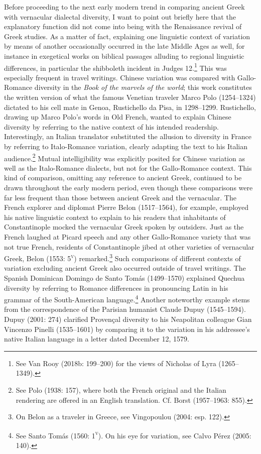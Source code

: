 \begin{styleStandard}
Before proceeding to the next early modern trend in comparing ancient Greek with vernacular dialectal diversity, I want to point out briefly here that the explanatory function did not come into being with the Renaissance revival of Greek studies. As a matter of fact, explaining one linguistic context of variation by means of another occasionally occurred in the late Middle Ages as well, for instance in exegetical works on biblical passages alluding to regional linguistic differences, in particular the shibboleth incident in Judges 12.\footnote{ See Van Rooy (2018b: 199–200) for the views of Nicholas of Lyra (1265–1349).} This was especially frequent in travel writings. Chinese variation was compared with Gallo-Romance diversity in the \textit{Book of the marvels of the world}; this work constitutes the written version of what the famous Venetian traveler Marco Polo (1254–1324) dictated to his cell mate in Genoa, Rustichello da Pisa, in 1298–1299. Rustichello, drawing up Marco Polo’s words in Old French, wanted to explain Chinese diversity by referring to the native context of his intended readership. Interestingly, an Italian translator substituted the allusion to diversity in France by referring to Italo-Romance variation, clearly adapting the text to his Italian audience.\footnote{ See Polo (1938: 157), where both the French original and the Italian rendering are offered in an English translation. Cf. Borst (1957–1963: 855).} Mutual intelligibility was explicitly posited for Chinese variation as well as the Italo-Romance dialects, but not for the Gallo-Romance context. This kind of comparison, omitting any reference to ancient Greek, continued to be drawn throughout the early modern period, even though these comparisons were far less frequent than those between ancient Greek and the vernacular. The French explorer and diplomat Pierre Belon (1517–1564), for example, employed his native linguistic context to explain to his readers that inhabitants of Constantinople mocked the vernacular Greek spoken by outsiders. Just as the French laughed at Picard speech and any other Gallo-Romance variety that was not true French, residents of Constantinople jibed at other varieties of vernacular Greek, Belon (1553: 5\textsc{\textsuperscript{v}}) remarked.\footnote{ On Belon as a traveler in Greece, see Vingopoulou (2004: esp. 122).} Such comparisons of different contexts of variation excluding ancient Greek also occurred outside of travel writings. The Spanish Dominican Domingo de Santo Tomás (1499–1570) explained Quechua diversity by referring to Romance differences in pronouncing Latin in his grammar of the South-American language.\footnote{ See Santo Tomás (1560: 1\textsc{\textsuperscript{v}}). On his eye for variation, see Calvo Pérez (2005: 140).} Another noteworthy example stems from the correspondence of the Parisian humanist Claude Dupuy (1545–1594). Dupuy (2001: 274) clarified Provençal diversity to his Neapolitan colleague Gian Vincenzo Pinelli (1535–1601) by comparing it to the variation in his addressee’s native Italian language in a letter dated December 12, 1579.
\end{styleStandard}

